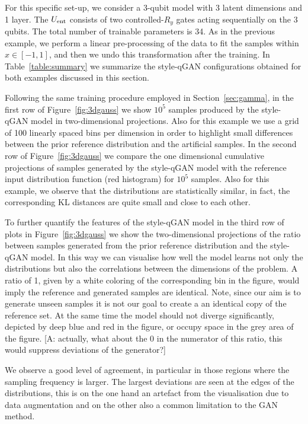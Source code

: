\documentclass[twocolumn,preprintnumbers,superscriptaddress]{revtex4-2}
\newcommand{\commentAF}[1]{{\color{cyan} {[A: #1]}}}
\begin{document}
For this specific set-up, we consider a 3-qubit model with 3 latent dimensions and
1 layer. The $U_{\rm ent}$ consists of two controlled-$R_{y}$ gates acting sequentially on the 3 qubits.
The total number of trainable parameters is 34. As in the previous example, we perform a linear pre-processing of the data to fit the samples within $x \in [-1, 1]$, and then we undo this transformation after the training. In Table~\ref{table:summary}
we summarize the style-qGAN configurations obtained for both examples discussed in
this section.

Following the same training procedure employed in Section~\ref{sec:gamma}, in
the first row of Figure~\ref{fig:3dgauss} we show $10^5$ samples produced by the
style-qGAN model in two-dimensional projections. Also for this example we use a
grid of 100 linearly spaced bins per dimension in order to highlight small
differences between the prior reference distribution and the artificial samples.
%
In the second row of Figure~\ref{fig:3dgauss} we compare the one dimensional
cumulative projections of samples generated by the style-qGAN model with the
reference input distribution function (red histogram) for $10^5$ samples. Also
for this example, we observe that the distributions are statistically similar,
in fact, the corresponding KL distances are quite small and close to each other.

To further quantify the features of the style-qGAN model in the third row of plots in Figure~\ref{fig:3dgauss} we show the two-dimensional projections of the ratio between samples generated from the prior reference distribution and the style-qGAN model.
In this way we can visualise how well the model learns not only the distributions but also the correlations between the dimensions of the problem. A ratio of 1, given by a white coloring of the corresponding bin in the figure, would imply the reference and generated samples are identical. Note, since our aim is to generate unseen samples it is not our goal to create a an identical copy of the reference set. At the same time the model should not diverge significantly, depicted by deep blue and red in the figure, or occupy space in the grey area of the figure. 
\commentAF{actually, what about the 0 in the numerator of this ratio, this would suppress deviations of the generator?}

We observe a good level of agreement, in particular in those regions where the
sampling frequency is larger. The largest deviations are seen at the edges of the distributions, this is on the one hand an artefact from the visualisation due to data augmentation and on the other also a common limitation to the GAN method.
\end{document}
